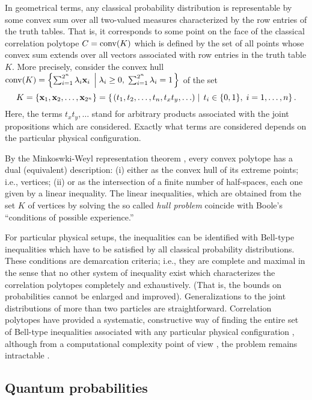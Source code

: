 \documentclass[%
  preprint,
 showpacs,
 showkeys,
 preprintnumbers,
 amsmath,amssymb,
 aps,
 rmp,
  longbibliography,
 ]{revtex4-1}
\begin{document}
In geometrical terms,
any classical probability distribution is representable by some convex sum over
all two-valued measures characterized by the row entries of the truth tables.
That is, it corresponds to
some point on the face of the classical correlation polytope $C={\rm conv} (K)$
which is defined by the set of all points whose
convex sum extends over all vectors associated with row entries in the truth table $K$.
More precisely,
consider the convex hull
${\rm conv} (K)=\left\{ \sum_{i=1}^{2^n} \lambda_i{\bf x}_i
  \; \left|  \;
\lambda_i\ge 0,\; \sum_{i=1}^{2^n}\lambda_i =1
\right.
\right\} $
of the set
$$K
=\{{\bf x}_1,{\bf x}_2,\ldots ,{\bf x}_{2^n}\}
= \left\{
\left.
\large(t_1, t_2,\ldots , t_n, t_xt_y,\ldots \large)
\; \right| \;
t_i \in \{0,1\},\; i=1,\ldots ,n
\right\}.$$
Here, the terms $t_xt_y,\ldots$ stand for arbitrary products associated with
the joint propositions which are considered. Exactly what terms  are
considered depends on the particular physical configuration.

By the Minkoswki-Weyl representation theorem \cite[p.29]{ziegler},
every convex polytope has a dual (equivalent) description:
(i)
either as the convex hull of its extreme points; i.e., vertices;
(ii)
or as the intersection of a finite number of half-spaces,
each one given by a linear inequality.
The linear inequalities,
which are obtained
from the set $K$ of vertices
by solving the so called {\em hull problem}
coincide with Boole's ``conditions of possible experience.''

For particular physical setups,
the inequalities can be identified with Bell-type inequalities which have to be satisfied by
all classical probability distributions.
These conditions are demarcation criteria; i.e.,
they are complete and maximal in the sense that no other system of inequality exist
which characterizes the correlation polytopes completely and exhaustively.
(That is, the bounds on probabilities cannot be enlarged and improved).
Generalizations to the joint distributions of more than two particles are straightforward.
Correlation polytopes have provided a systematic, constructive way of finding
the entire set of Bell-type inequalities associated with any particular physical configuration
\cite{2000-poly,2001-cddif}, although from a computational complexity point of view
\cite{garey}, the problem remains intractable \cite{Pit-91}.

\subsection{Quantum probabilities}
\end{document}
